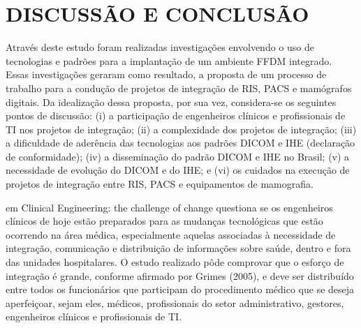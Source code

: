 \chapter[DISCUSSÃO E CONCLUSÃO]{\textbf{DISCUSSÃO E CONCLUSÃO}}
Através deste estudo foram realizadas investigações envolvendo o uso de tecnologias e
padrões para a implantação de um ambiente FFDM integrado. Essas investigações geraram
como resultado, a proposta de um processo de trabalho para a condução de projetos de
integração de RIS, PACS e mamógrafos digitais. Da idealização dessa proposta, por sua
vez, considera-se os seguintes pontos de discussão: (i) a participação de engenheiros
clínicos e profissionais de TI nos projetos de integração; (ii) a complexidade dos projetos
de integração; (iii) a dificuldade de aderência das tecnologias aos padrões DICOM e IHE
(declaração de conformidade); (iv) a disseminação do padrão DICOM e IHE no Brasil; (v)
a necessidade de evolução do DICOM e do IHE; e (vi) os cuidados na execução de
projetos de integração entre RIS, PACS e equipamentos de mamografia.


\cite{grimes} em Clinical Engineering: the challenge of change questiona se os
engenheiros clínicos de hoje estão preparados para as mudanças tecnológicas que estão
ocorrendo na área médica, especialmente aquelas associadas à necessidade de integração,
comunicação e distribuição de informações sobre saúde, dentro e fora das unidades
hospitalares. O estudo realizado pôde comprovar que o esforço de integração é grande,
conforme afirmado por Grimes (2005), e deve ser distribuído entre todos os funcionários
que participam do procedimento médico que se deseja aperfeiçoar, sejam eles, médicos,
profissionais do setor administrativo, gestores, engenheiros clínicos e profissionais de TI.

